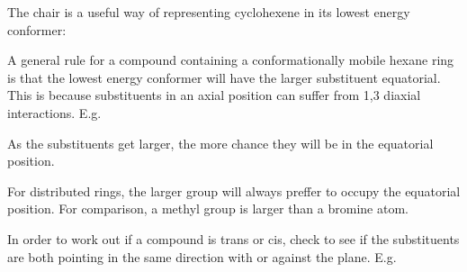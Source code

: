 
The chair is a useful way of representing cyclohexene in its lowest energy conformer:


A general rule for a compound containing a conformationally mobile hexane ring is
that the lowest energy conformer will have the larger substituent equatorial. This
is because substituents in an axial position can suffer from 1,3 diaxial
interactions. E.g.


As the substituents get larger, the more chance they will be in the equatorial
position.

For distributed rings, the larger group will always preffer to occupy the equatorial
position. For comparison, a methyl group is larger than a bromine atom.

In order to work out if a compound is trans or cis, check to see if the substituents
are both pointing in the same direction with or against the plane. E.g.

